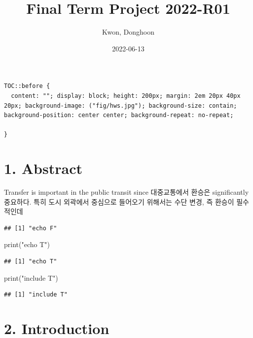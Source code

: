\documentclass[
]{article}
\title{Final Term Project 2022-R01}
\author{Kwon, Donghoon}
\date{2022-06-13}
\newenvironment{Shaded}{\begin{snugshade}}{\end{snugshade}}
\newcommand{\FunctionTok}[1]{\textcolor[rgb]{0.00,0.00,0.00}{#1}}
\newcommand{\NormalTok}[1]{#1}
\newcommand{\StringTok}[1]{\textcolor[rgb]{0.31,0.60,0.02}{#1}}
\begin{document}
\maketitle

{
\setcounter{tocdepth}{2}
\tableofcontents
}
\begin{verbatim}
TOC::before {
  content: ""; display: block; height: 200px; margin: 2em 20px 40px 20px; background-image: ("fig/hws.jpg"); background-size: contain; background-position: center center; background-repeat: no-repeat; 

}
\end{verbatim}

\hypertarget{abstract}{%
\section{1. Abstract}\label{abstract}}

Transfer is important in the public transit since 대중교통에서 환승은
significantly 중요하다. 특히 도시 외곽에서 중심으로 들어오기 위해서는
수단 변경, 즉 환승이 필수적인데

\begin{verbatim}
## [1] "echo F"
\end{verbatim}

\begin{Shaded}
\begin{Highlighting}[]
\FunctionTok{print}\NormalTok{(}\StringTok{"echo T"}\NormalTok{)}
\end{Highlighting}
\end{Shaded}

\begin{verbatim}
## [1] "echo T"
\end{verbatim}

\begin{Shaded}
\begin{Highlighting}[]
\FunctionTok{print}\NormalTok{(}\StringTok{"include T"}\NormalTok{)}
\end{Highlighting}
\end{Shaded}

\begin{verbatim}
## [1] "include T"
\end{verbatim}

\hypertarget{introduction}{%
\section{2. Introduction}\label{introduction}}
\end{document}

